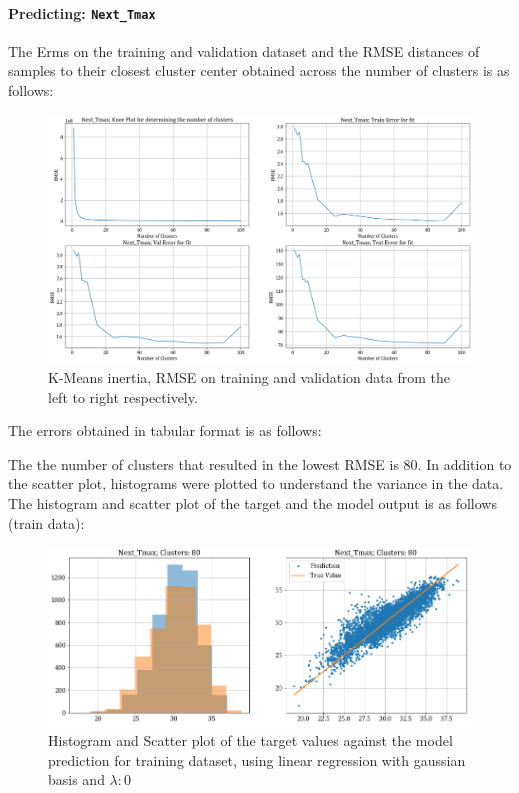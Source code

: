 \documentclass[12pt,a4paper]{article}
\newcommand{\noi}{\noindent}
\def\tt#1{\texttt{#1}}
\begin{document}
\paragraph{Predicting: \tt{Next\_Tmax}}
The Erms on the training and validation dataset and the RMSE distances of samples to their closest cluster center obtained across the number of clusters is as follows:
\begin{figure}[H]
     \centering
     \includegraphics[scale=0.4]{images/t3_d3/no_reg/tmax_errors.png}
     \caption{K-Means inertia, RMSE on training and validation data from the left to right respectively.}
\end{figure}

\vspace{-1em}
\noi
The errors obtained in tabular format is as follows:


\noi
The the number of clusters that resulted in the lowest RMSE is 80. In addition to the scatter plot, histograms were plotted to understand the variance in the data.\\

\noi
The histogram and scatter plot of the target and the model output is as follows (train data):
\begin{figure}[H]
     \centering
     \includegraphics[scale=0.49]{images/t3_d3/no_reg/T_max_nclu_80.png}
     \caption{Histogram and Scatter plot of the target values against the model prediction for training dataset, using linear regression with gaussian basis and $\lambda: 0$}
\end{figure}
\end{document}

